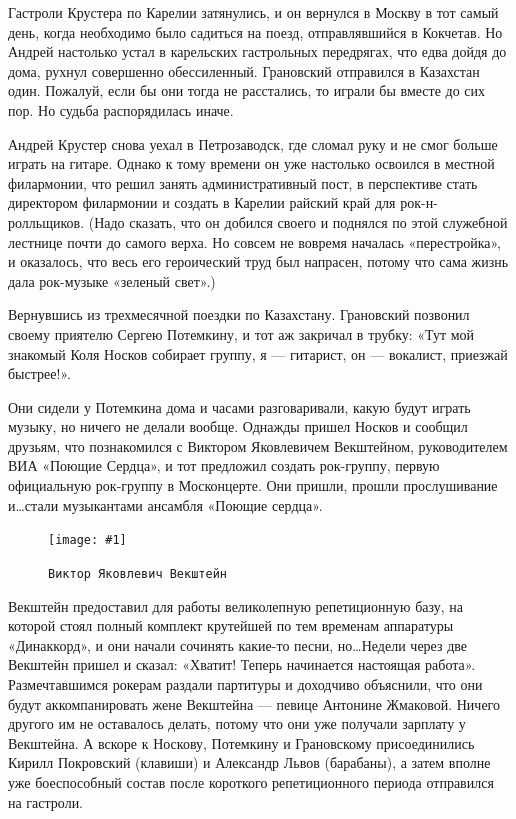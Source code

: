 \documentclass[16pt,a5paper]{book}
\newcommand{\myincludegraphics}[1]{\texttt{[image: \#1]}}
\begin{document}
Гастроли Крустера по Карелии затянулись, и он вернулся в Москву в тот самый день, когда необходимо было садиться на
поезд, отправлявшийся в Кокчетав. Но Андрей настолько устал в карельских гастрольных передрягах, что едва дойдя до дома,
рухнул совершенно обессиленный. Грановский отправился в Казахстан один. Пожалуй, если бы они тогда не расстались, то
играли бы вместе до сих пор. Но судьба распорядилась иначе.

Андрей Крустер снова уехал в Петрозаводск, где сломал руку и не смог больше играть на гитаре. Однако к тому времени он
уже настолько освоился в местной филармонии, что решил занять административный пост, в перспективе стать директором
филармонии и создать в Карелии райский край для рок-н-ролльщиков. (Надо сказать, что он добился своего и поднялся по
этой служебной лестнице почти до самого верха. Но совсем не вовремя началась «перестройка», и оказалось, что весь его
героический труд был напрасен, потому что сама жизнь дала рок-музыке «зеленый свет».)

Вернувшись из трехмесячной поездки по Казахстану. Грановский позвонил своему приятелю Сергею Потемкину, и тот аж
закричал в трубку: «Тут мой знакомый Коля Носков собирает группу, я — гитарист, он — вокалист, приезжай быстрее!».

Они сидели у Потемкина дома и часами разговаривали, какую будут играть музыку, но ничего не делали вообще. Однажды
пришел Носков и сообщил друзьям, что познакомился с Виктором Яковлевичем Векштейном, руководителем ВИА «Поющие Сердца»,
и тот предложил создать рок-группу, первую официальную рок-группу в Москонцерте. Они пришли, прошли прослушивание
и\ldots стали музыкантами ансамбля «Поющие сердца».

\begin{figure}[h]
    \centering
    \myincludegraphics{Image10}
    \caption{\texttt{Виктор Яковлевич Векштейн}}
\end{figure}

Векштейн предоставил для работы великолепную репетиционную базу, на которой стоял полный комплект крутейшей по тем
временам аппаратуры «Динаккорд», и они начали сочинять какие-то песни, но\ldots Недели через две Векштейн пришел и
сказал: «Хватит! Теперь начинается настоящая работа». Размечтавшимся рокерам раздали партитуры и доходчиво объяснили,
что они будут аккомпанировать жене Векштейна — певице Антонине Жмаковой. Ничего другого им не оставалось делать, потому
что они уже получали зарплату у Векштейна. А вскоре к Носкову, Потемкину и Грановскому присоединились Кирилл Покровский
(клавиши) и Александр Львов (барабаны), а затем вполне уже боеспособный состав после короткого репетиционного периода
отправился на гастроли.
\end{document}
